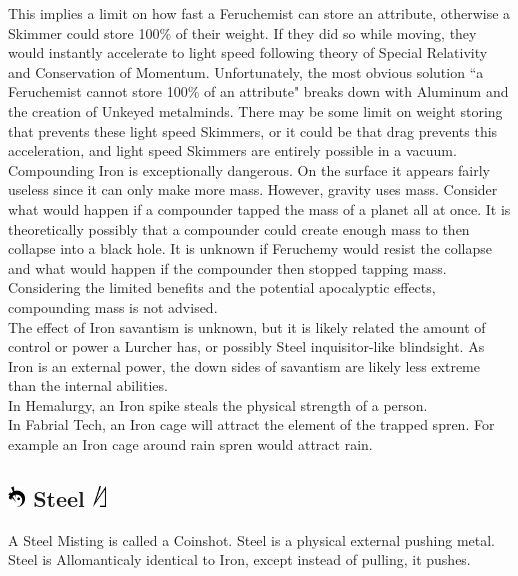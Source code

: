 \documentclass[conference]{IEEEtran}
\begin{document}
This implies a limit on how fast a Feruchemist can store an attribute, otherwise a Skimmer could store 100\% of their weight.  If they did so while moving, they would instantly accelerate to light speed\cite{Massless} following theory of Special Relativity\cite{spec-rel} and Conservation of Momentum.  Unfortunately, the most obvious solution ``a Feruchemist cannot store 100\% of an attribute" breaks down with Aluminum and the creation of Unkeyed metalminds.  There may be some limit on weight storing that prevents these light speed Skimmers, or it could be that drag prevents this acceleration, and light speed Skimmers are entirely possible in a vacuum.\\

Compounding Iron is exceptionally dangerous.  On the surface it appears fairly useless since it can only make more mass.  However, gravity uses mass.  Consider what would happen if a compounder tapped the mass of a planet all at once.  It is theoretically possibly that a compounder could create enough mass to then collapse into a black hole.\cite{swartz}  It is unknown if Feruchemy would resist the collapse and what would happen if the compounder then stopped tapping mass.
Considering the limited benefits and the potential apocalyptic effects, compounding mass is not advised. \\

The effect of Iron savantism is unknown, but it is likely related the amount of control or power a Lurcher has, or possibly Steel inquisitor-like blindsight.\cite{TFE-CH36}  As Iron is an external power, the down sides of savantism are likely less extreme than the internal abilities.\\

In Hemalurgy, an Iron spike steals the physical strength of a person.\cite{HE-TB}\\  

In Fabrial Tech, an Iron cage will attract the element of the trapped spren.\cite{RoW-E11}  For example an Iron cage around rain spren would attract rain.\cite{WoR-CH82}

\subsection*{\includegraphics[height=1em]{images/Steel.png}  Steel \includegraphics[height=1em]{images/Steel_(Feruchemy).png}}
A Steel Misting is called a Coinshot.\cite{ARS}  Steel is a physical external pushing metal.\cite{AL-TB}  Steel is Allomanticaly identical to Iron, except instead of pulling, it pushes.\cite{ARS}\\
\end{document}
